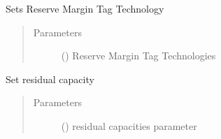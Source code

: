 \documentclass[a4paper,12pt,english]{article}
\begin{document}
\begin{fulllineitems}
\begin{fulllineitems}
\end{fulllineitems}


\begin{fulllineitems}
\label{\detokenize{GOCPI:GOCPI.CreateCases.CreateCases.set_reserve_margin_tag_technology}}
Sets Reserve Margin Tag Technology
\begin{quote}\begin{description}
\item[{Parameters}] \leavevmode
{} (\sphinxstyleliteralemphasis{\sphinxupquote{, }}) \textendash{} Reserve Margin Tag Technologies

\end{description}\end{quote}

\end{fulllineitems}


\begin{fulllineitems}
\label{\detokenize{GOCPI:GOCPI.CreateCases.CreateCases.set_residual_capacity}}
Set residual capacity
\begin{quote}\begin{description}
\item[{Parameters}] \leavevmode
{} (\sphinxstyleliteralemphasis{\sphinxupquote{, }}) \textendash{} residual capacities parameter

\end{description}\end{quote}

\end{fulllineitems}


\end{fulllineitems}
\end{document}
